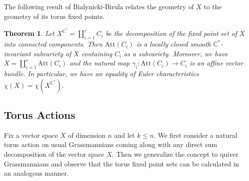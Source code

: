 \documentclass{amsart}
\newtheorem{theorem}{Theorem}[section]
\numberwithin{equation}{section}
\newcommand{\C}{\mathbb{C}}
\begin{document}
The following result of Bialynicki-Birula relates the geometry of $X$ to the geometry of its torus fixed points.
\begin{theorem}\label{thm:bb}
  \cite[Section 4]{bb}
  Let $X^{\C^\ast}=\coprod_{i=1}^r C_i$ be the decomposition of the fixed point set of $X$ into connected components.
  Then $\mathrm{Att}(C_i)$ is a locally closed smooth $\C^\ast$-invariant subvariety of $X$ containing $C_i$ as a subvariety.
  Moreover, we have $X=\coprod_{i=1}^r\mathrm{Att}(C_i)$ and the natural map $\gamma_i:\mathrm{Att}(C_i)\to C_i$ is an affine vector bundle. 
  In particular, we have an equality of Euler characteristics $\chi(X)=\chi(X^{\C^\ast})$.
\end{theorem}


\subsection{Torus Actions}
\label{torusaction}
Fix a vector space $X$ of dimension $n$ and let $k\leq n$.
We first consider a natural torus action on usual Grassmannians coming along with any direct sum decomposition of the vector space $X$.
Then we generalize the concept to quiver Grassmannians and observe that the torus fixed point sets can be calculated in an analogous manner.
\end{document}
